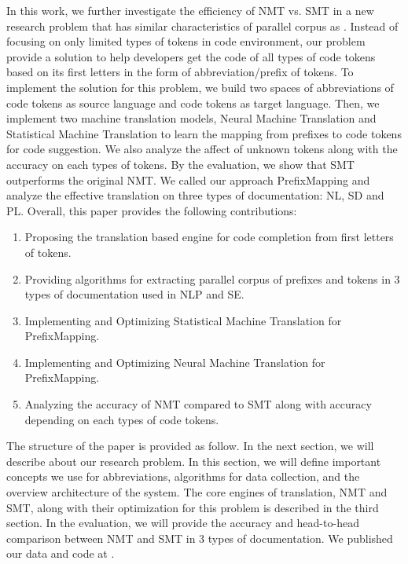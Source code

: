 In this work, we further investigate the efficiency of NMT vs. SMT in a new research problem that has similar characteristics of parallel corpus as \cite{026,027,028}. Instead of focusing on only limited types of tokens in code environment, our problem provide a solution to help developers get the code of all types of code tokens based on its first letters in the form of abbreviation/prefix of tokens. To implement the solution for this problem, we build two spaces of abbreviations of code tokens as source language and code tokens as target language. Then, we implement two machine translation models, Neural Machine Translation and Statistical Machine Translation to learn the mapping from prefixes to code tokens for code suggestion. We also analyze the affect of unknown tokens along with the accuracy on each types of tokens. By the evaluation, we show that SMT outperforms the original NMT. We called our approach PrefixMapping and analyze the effective translation on three types of documentation: NL, SD and PL. Overall, this paper provides the following contributions:

\begin{enumerate}
\item Proposing the translation based engine for code completion from first letters of tokens.
\item Providing algorithms for extracting parallel corpus of prefixes and tokens in 3 types of documentation used in NLP and SE.
\item Implementing and Optimizing Statistical Machine Translation for PrefixMapping.
\item Implementing and Optimizing Neural Machine Translation for PrefixMapping.
\item Analyzing the accuracy of NMT compared to SMT along with accuracy depending on each types of code tokens.
\end{enumerate}

The structure of the paper is provided as follow. In the next section, we will describe about our research problem. In this section, we will define important concepts we use for abbreviations, algorithms for data collection, and the overview architecture of the system. The core engines of translation, NMT and SMT, along with their optimization for this problem is described in the third section. In the evaluation, we will provide the accuracy and head-to-head comparison between NMT and SMT in 3 types of documentation. We published our data and code at \cite{053}.



